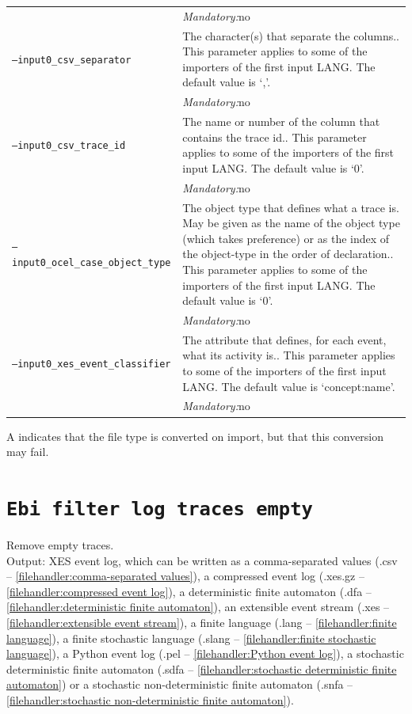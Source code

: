 {\begin{tabularx}{\linewidth}{lX}
&\textit{Mandatory:}\quad no\\
\texttt{--input0\_csv\_separator} & The character(s) that separate the columns.. This parameter applies to some of the importers of the first input LANG. The default value is `,'.\\
&\textit{Mandatory:}\quad no\\
\texttt{--input0\_csv\_trace\_id} & The name or number of the column that contains the trace id.. This parameter applies to some of the importers of the first input LANG. The default value is `0'.\\
&\textit{Mandatory:}\quad no\\
\texttt{--input0\_ocel\_case\_object\_type} & The object type that defines what a trace is. May be given as the name of the object type (which takes preference) or as the index of the object-type in the order of declaration.. This parameter applies to some of the importers of the first input LANG. The default value is `0'.\\
&\textit{Mandatory:}\quad no\\
\texttt{--input0\_xes\_event\_classifier} & The attribute that defines, for each event, what its activity is.. This parameter applies to some of the importers of the first input LANG. The default value is `concept:name'.\\
&\textit{Mandatory:}\quad no\\
\bottomrule
\end{tabularx}
A \textdagger{} indicates that the file type is converted on import, but that this conversion may fail.
\clearpage\section{\texttt{Ebi filter log traces empty}}
\label{command:Ebi filter log traces empty}
Remove empty traces.\\
\noindent Output: XES event log, which can be written as a comma-separated values (.csv -- \cref{filehandler:comma-separated values}), a compressed event log (.xes.gz -- \cref{filehandler:compressed event log}), a deterministic finite automaton (.dfa -- \cref{filehandler:deterministic finite automaton}), an extensible event stream (.xes -- \cref{filehandler:extensible event stream}), a finite language (.lang -- \cref{filehandler:finite language}), a finite stochastic language (.slang -- \cref{filehandler:finite stochastic language}), a Python event log (.pel -- \cref{filehandler:Python event log}), a stochastic deterministic finite automaton (.sdfa -- \cref{filehandler:stochastic deterministic finite automaton}) or a stochastic non-deterministic finite automaton (.snfa -- \cref{filehandler:stochastic non-deterministic finite automaton}).\\
}
